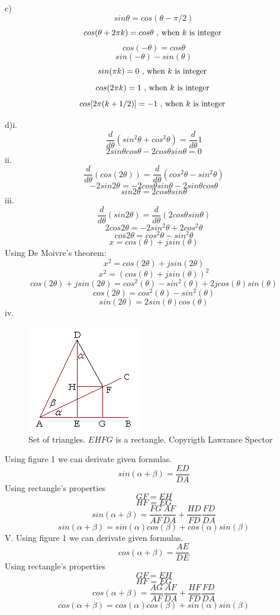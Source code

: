 \documentclass{article}
\begin{document}
	c)
	$$sin\theta=cos(\theta-\pi/2)$$
	$$cos(\theta+2\pi k)=cos\theta \textnormal{ , when } k \textnormal{ is integer }$$
	$$cos(-\theta)=cos\theta$$
	$$sin(-\theta)-sin(\theta)$$
	$$sin(\pi k)=0 \textnormal{ , when } k \textnormal{ is integer }$$
	$$cos(2 \pi k) = 1 \textnormal{ , when } k \textnormal{ is integer }$$
	$$cos[2 \pi (k+1/2)]=-1 \textnormal{ , when } k \textnormal{ is integer }$$
	\par
	d)i.
	$$\frac{d}{d\theta} (sin^2\theta + cos^2\theta)=\frac{d}{d\theta}1$$
	$$2sin\theta cos\theta-2cos\theta sin\theta = 0 $$
	ii.
	$$\frac{d}{d\theta}(cos(2\theta))=\frac{d}{d\theta}(cos^2\theta-sin^2\theta)$$
	$$-2sin2\theta=-2cos\theta sin\theta-2sin\theta cos\theta$$
	$$sin2\theta = 2cos\theta sin\theta$$
	iii.
	$$\frac{d}{d\theta}(sin2\theta) = \frac{d}{d\theta}(2cos\theta sin\theta)$$
	$$2cos2\theta=-2sin^2\theta +2cos^2\theta$$
	$$cos2\theta=cos^2\theta -sin^2\theta$$
	$$x=cos(\theta)+jsin(\theta)$$
	Using De Moivre's theorem:
	$$x^2=cos(2\theta) +jsin(2\theta )$$
	$$x^2=(cos(\theta) +jsin(\theta ))^2$$
	$$cos(2\theta) +jsin(2\theta)=cos^2(\theta) -sin^2(\theta )+2jcos(\theta)sin(\theta)$$
	$$cos(2\theta)=cos^2(\theta)-sin^2(\theta)$$
	$$sin(2\theta)=2sin(\theta)cos(\theta)$$
	iv.
	\begin{figure}
		\caption{Set of triangles. $EHFG$ is a rectangle. Copyrigth Lawrance Spector}
		\centering	
		\includegraphics[scale=0.8]{q5iv}
	\end{figure}
	Using figure 1 we can derivate given formulas.
	$$sin(\alpha+\beta)=\frac{ED}{DA}$$
	Using rectangle's properties
	$$GF=EH$$
	$$HF=EG$$
	$$sin(\alpha+\beta)=\frac{FG}{AF}\frac{AF}{DA}+\frac{HD}{FD}\frac{FD}{DA}$$
	$$sin(\alpha+\beta)=sin(\alpha)cos(\beta)+cos(\alpha)sin(\beta)$$
	V.
	Using figure 1 we can derivate given formulas.
	$$cos(\alpha+\beta)=\frac{AE}{DE}$$
	Using rectangle's properties
	$$GF=EH$$
	$$HF=EG$$
	$$cos(\alpha+\beta)=\frac{AG}{AF}\frac{AF}{DA}+\frac{HF}{FD}\frac{FD}{DA}$$
	$$cos(\alpha+\beta)=cos(\alpha)cos(\beta)+sin(\alpha)sin(\beta)$$
	\par
	
\end{document}
